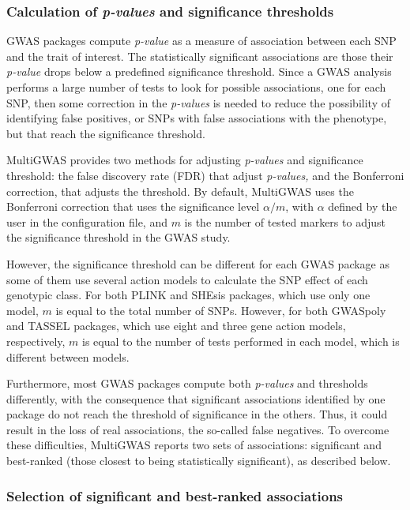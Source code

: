 \documentclass{article}
\begin{document}
\subsubsection{Calculation of \emph{p-values }and significance thresholds}

GWAS packages compute \emph{p-value }as a measure of association between each SNP and the trait of interest. The statistically significant associations are those their \emph{p-value }drops below a predefined significance threshold. Since a GWAS analysis performs a large number of tests to look for possible associations, one for each SNP, then some correction in the \emph{p-values} is needed to reduce the possibility of identifying false positives, or SNPs with false associations with the phenotype, but that reach the significance threshold.

MultiGWAS provides two methods for adjusting \emph{p-values} and significance threshold: the false discovery rate (FDR) that adjust \emph{p-values, }and the Bonferroni correction, that adjusts the threshold. By default, MultiGWAS uses the Bonferroni correction that uses the significance level $\alpha/m$, with $\alpha$ defined by the user in the configuration file, and $m$ is the number of tested markers to adjust the significance threshold in the GWAS study. 

However, the significance threshold can be different for each GWAS package as some of them use several action models to calculate the SNP effect of each genotypic class. For both PLINK and SHEsis packages, which use only one model, $m$ is equal to the total number of SNPs. However, for both GWASpoly and TASSEL packages, which use eight and three gene action models, respectively, $m$ is equal to the number of tests performed in each model, which is different between models.

Furthermore, most GWAS packages compute both \emph{p-values} and thresholds differently, with the consequence that significant associations identified by one package do not reach the threshold of significance in the others. Thus, it could result in the loss of real associations, the so-called false negatives. To overcome these difficulties, MultiGWAS reports two sets of associations: significant and best-ranked (those closest to being statistically significant), as described below.

\subsubsection{Selection of significant and best-ranked associations}
\end{document}
